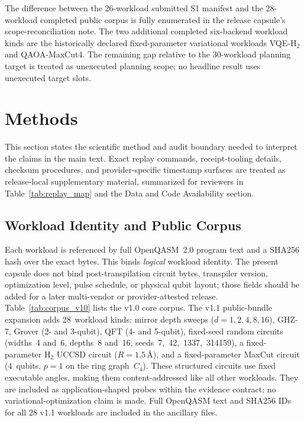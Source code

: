 \documentclass[aps,prxquantum,twocolumn,superscriptaddress,amsmath,amssymb,longbibliography,floatfix]{revtex4-2}
\begin{document}
The difference between the 26-workload submitted S1 manifest and the 28-workload completed public corpus is fully enumerated in the release capsule's scope-reconciliation note. The two additional completed six-backend workload kinds are the historically declared fixed-parameter variational workloads VQE-H$_2$ and QAOA-MaxCut4. The remaining gap relative to the 30-workload planning target is treated as unexecuted planning scope; no headline result uses unexecuted target slots.

\section{Methods}
\label{sec:methods}

This section states the scientific method and audit boundary needed to interpret the claims in the main text. Exact replay commands, receipt-tooling details, checksum procedures, and provider-specific timestamp surfaces are treated as release-local supplementary material, summarized for reviewers in Table~\ref{tab:replay_map} and the Data and Code Availability section.

\subsection{Workload Identity and Public Corpus}
\label{sec:corpus}

Each workload is referenced by full OpenQASM~2.0 program text and a SHA256 hash over the exact bytes. This binds \emph{logical} workload identity. The present capsule does not bind post-transpilation circuit bytes, transpiler version, optimization level, pulse schedule, or physical qubit layout; those fields should be added for a later multi-vendor or provider-attested release. Table~\ref{tab:corpus_v10} lists the v1.0 core corpus. The v1.1 public-bundle expansion adds 28~workload kinds: mirror depth sweeps ($d{=}1,2,4,8,16$), GHZ-7, Grover (2- and 3-qubit), QFT (4- and 5-qubit), fixed-seed random circuits (widths~4 and~6, depths~8 and~16, seeds~7,~42,~1337,~314159), a fixed-parameter H$_2$ UCCSD circuit ($R = 1.5$\,\AA), and a fixed-parameter MaxCut circuit (4~qubits, $p{=}1$ on the ring graph~$C_4$). These structured circuits use fixed executable angles, making them content-addressed like all other workloads. They are included as application-shaped probes within the evidence contract; no variational-optimization claim is made. Full OpenQASM text and SHA256 IDs for all 28 v1.1 workloads are included in the ancillary files.
\end{document}
